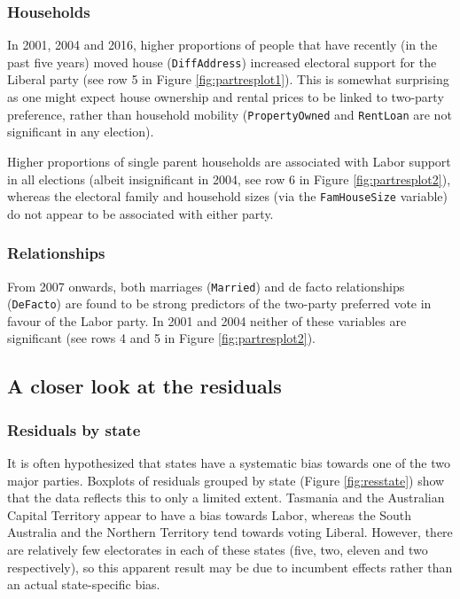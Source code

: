 \documentclass[times, doublespace]{anzsauth}
\begin{document}
\hypertarget{households}{%
\subsubsection*{Households}\label{households}}

In 2001, 2004 and 2016, higher proportions of people that have recently (in the past five years) moved house (\texttt{DiffAddress}) increased electoral support for the Liberal party (see row 5 in Figure \ref{fig:partresplot1}). This is somewhat surprising as one might expect house ownership and rental prices to be linked to two-party preference, rather than household mobility (\texttt{PropertyOwned} and \texttt{RentLoan} are not significant in any election).

Higher proportions of single parent households are associated with Labor support in all elections (albeit insignificant in 2004, see row 6 in Figure \ref{fig:partresplot2}), whereas the electoral family and household sizes (via the \texttt{FamHouseSize} variable) do not appear to be associated with either party.

\hypertarget{relationships}{%
\subsubsection*{Relationships}\label{relationships}}

From 2007 onwards, both marriages (\texttt{Married}) and de facto relationships (\texttt{DeFacto}) are found to be strong predictors of the two-party preferred vote in favour of the Labor party. In 2001 and 2004 neither of these variables are significant (see rows 4 and 5 in Figure \ref{fig:partresplot2}).

\hypertarget{a-closer-look-at-the-residuals}{%
\subsection{A closer look at the residuals}\label{a-closer-look-at-the-residuals}}

\hypertarget{residuals-by-state}{%
\subsubsection*{Residuals by state}\label{residuals-by-state}}

It is often hypothesized that states have a systematic bias towards one of the two major parties. Boxplots of residuals grouped by state (Figure \ref{fig:resstate}) show that the data reflects this to only a limited extent. Tasmania and the Australian Capital Territory appear to have a bias towards Labor, whereas the South Australia and the Northern Territory tend towards voting Liberal. However, there are relatively few electorates in each of these states (five, two, eleven and two respectively), so this apparent result may be due to incumbent effects rather than an actual state-specific bias.
\end{document}
